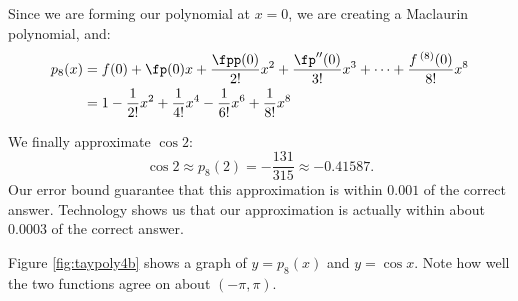 {Since we are forming our polynomial at $x=0$, we are creating a Maclaurin polynomial, and:
\begin{align*}
p_8(x) &= f(0) + \fp(0)x + \frac{\fpp(0)}{2!}x^2 + \frac{\fp''(0)}{3!}x^3 + \cdots +\frac{f\,^{(8)}(0)}{8!}x^8\\
		&=  1-\frac{1}{2!}x^2+\frac{1}{4!}x^4-\frac{1}{6!}x^6+\frac{1}{8!}x^8
\end{align*}

\enlargethispage{2\baselineskip}
We finally approximate $\cos 2$:
\[
\cos 2 \approx p_8(2) = -\frac{131}{315} \approx -0.41587.
\]
Our error bound guarantee that this approximation is within $0.001$ of the correct answer. Technology shows us that our approximation is actually within about $0.0003$ of the correct answer.

Figure \ref{fig:taypoly4b} shows a graph of $y=p_8(x)$ and $y=\cos x$. Note how well the two functions agree on about $(-\pi,\pi)$.
}

\medskip


